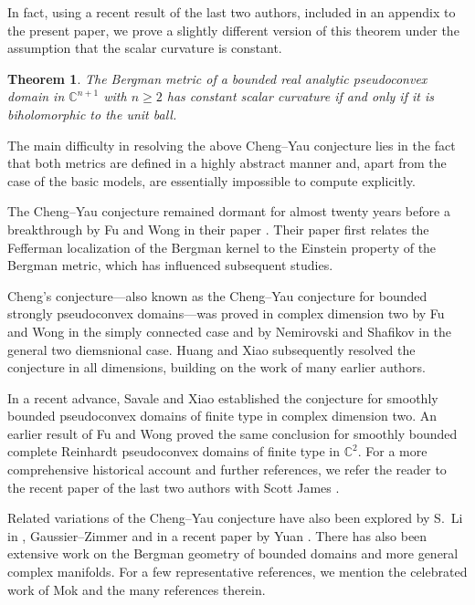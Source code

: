 \documentclass[a4paper,centertags,oneside,12pt]{amsart}
\newtheorem{theorem}{Theorem}[section]
\numberwithin{equation}{section}
\begin{document}
In fact, using a recent result of the last two authors, included in an appendix to the present paper, we prove a slightly different version of this theorem under the assumption that the scalar curvature is constant.



\renewcommand{\thetheorem}{1.1'}
\begin{theorem}\label{Main theorem-CSC}
    The Bergman metric of a bounded real analytic pseudoconvex domain in $\mathbb C^{n+1}$ with $n\geq 2$ has constant scalar curvature if and only if it is biholomorphic to the unit ball.
\end{theorem}
\renewcommand{\thetheorem}{\arabic{section}.\arabic{theorem}} 





The main difficulty in resolving the above Cheng--Yau conjecture lies in the fact that both metrics are defined in a highly abstract manner and, apart from the case of the basic models, are essentially impossible to compute explicitly.


The Cheng--Yau conjecture remained dormant for almost twenty years before a breakthrough by Fu and Wong in their  paper \cite{FW97}. Their paper first relates the  Fefferman localization  of the Bergman kernel to the Einstein property of the Bergman metric, which has influenced  subsequent studies.  

Cheng's conjecture---also known as the Cheng--Yau conjecture for bounded strongly pseudoconvex domains---was proved in complex dimension two by Fu and Wong \cite{FW97} in the simply connected case and by Nemirovski and Shafikov \cite{NS06} in the general two diemsnional  case. Huang and Xiao \cite{HX21} subsequently resolved the conjecture in all dimensions, building on the work of many earlier authors.

In a recent advance, Savale and Xiao \cite{SX25} established the conjecture for smoothly bounded pseudoconvex domains of finite type in complex dimension two. An earlier result of Fu and Wong \cite{FW97} proved the same conclusion for smoothly bounded complete Reinhardt pseudoconvex domains of finite type in \(\mathbb{C}^2\). For a more comprehensive historical account and further references, we refer the reader to the recent paper of the last two authors with Scott James \cite{HJL25}.



Related variations of the Cheng--Yau conjecture have also been explored by S.~Li in \cite{Li05,Li09,Li16}, Gaussier--Zimmer \cite{GZ22} and in a recent paper by Yuan \cite{Yuan25}. There has also been extensive work on the Bergman geometry of bounded domains and more general complex manifolds. For a few representative references, we mention the celebrated work  of Mok  \cite{Mo89,Mo12} and the many references therein.
\end{document}
